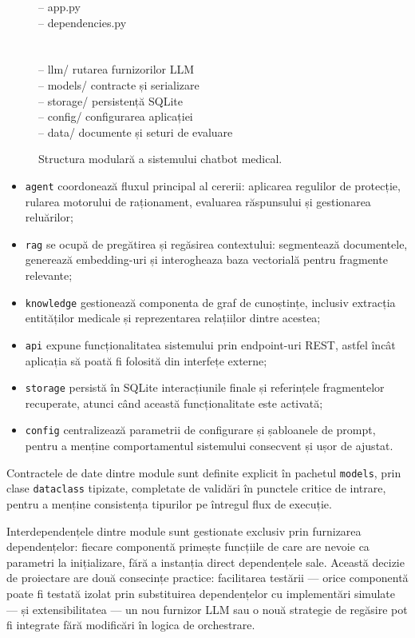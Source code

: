 \documentclass[12pt, a4paper, oneside, romanian]{teza-upb}
\begin{document}
\begin{figure}[H]
{\begin{minipage}{0.90\textwidth}
\textbar\quad \textbar-- app.py\\
\textbar\quad \textbar-- dependencies.py\\
\textbar\\
\textbar\\
\textbar-- llm/ \hfill rutarea furnizorilor LLM\\
\textbar-- models/ \hfill contracte și serializare\\
\textbar-- storage/ \hfill persistență SQLite\\
\textbar-- config/ \hfill configurarea aplicației\\
\textbar-- data/ \hfill documente și seturi de evaluare
\end{minipage}
}
\caption{Structura modulară a sistemului chatbot medical.}
\label{fig:structura_modulara_proiect}
\end{figure}


\begin{itemize}
    \item \texttt{agent} coordonează fluxul principal al cererii: aplicarea regulilor de protecție, rularea motorului de raționament, evaluarea răspunsului și gestionarea reluărilor;
    \item \texttt{rag} se ocupă de pregătirea și regăsirea contextului: segmentează documentele, generează embedding-uri și interogheaza baza vectorială pentru fragmente relevante;
    \item \texttt{knowledge} gestionează componenta de graf de cunoștințe, inclusiv extracția entităților medicale și reprezentarea relațiilor dintre acestea;
    \item \texttt{api} expune funcționalitatea sistemului prin endpoint-uri REST, astfel încât aplicația să poată fi folosită din interfețe externe;
    \item \texttt{storage} persistă în SQLite interacțiunile finale și referințele fragmentelor recuperate, atunci când această funcționalitate este activată;
    \item \texttt{config} centralizează parametrii de configurare și șabloanele de prompt, pentru a menține comportamentul sistemului consecvent și ușor de ajustat.
\end{itemize}
Contractele de date dintre module sunt definite explicit în pachetul \texttt{models}, prin clase \texttt{dataclass} tipizate, completate de validări în punctele critice de intrare, pentru a menține consistența tipurilor pe întregul flux de execuție.


Interdependențele dintre module sunt gestionate exclusiv prin furnizarea dependențelor: fiecare componentă primește funcțiile de care are nevoie ca parametri la inițializare, fără a instanția direct dependențele sale. Această decizie de proiectare are două consecințe practice: facilitarea testării — orice componentă poate fi testată izolat prin substituirea dependențelor cu implementări simulate — și extensibilitatea — un nou furnizor LLM sau o nouă strategie de regăsire pot fi integrate fără modificări în logica de orchestrare.
\end{document}
